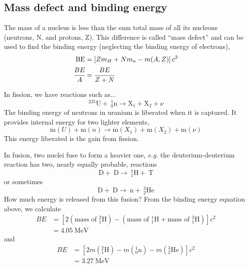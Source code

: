 \documentclass[11pt]{report} %
\begin{document}
\subsection{Mass defect and binding energy}
The mass of a nucleus is less than the sum total mass of all its nucleons (neutrons, N, and protons, Z). This difference is called ``mass defect'' and can be used to find the binding energy (neglecting the binding energy of electrons),
\begin{align}
\mathrm{BE} &= \left[Zm_H + Nm_n - m(A,Z)\right]c^2\\
\cfrac{BE}{A}&=\cfrac{BE}{Z+N}
\end{align}

In fission, we have reactions such as...
\begin{equation}
^{235}\mathrm{U}+~_0^1\mathrm{n} \rightarrow \mathrm{X}_1 +\mathrm{ X}_2 + \nu
\end{equation}
The binding energy of neutrons in uranium is liberated when it is captured. It provides internal energy for two lighter elements,
\begin{equation}
\mathrm{m}(U) + \mathrm{m}(n) \rightarrow \mathrm{m}(X_1) + \mathrm{m}(X_2) + \mathrm{m}(\nu)
\end{equation}
This energy liberated is the gain from fission.

In fusion, two nuclei fuse to form a heavier one, {\it e.g.} the deuterium-deuterium reaction has two, nearly equally probable, reactions
\begin{equation}
\mathrm{D} +~\mathrm{D}\xrightarrow{}~_1^1\mathrm{H}+~\mathrm{T}
\end{equation}
or sometimes
\begin{equation}
\mathrm{D} +~\mathrm{D}\xrightarrow{}~\mathrm{n}+~^3_2\mathrm{He}
\end{equation}
How much energy is released from this fusion? From the binding energy equation above, we calculate
\begin{align*}
BE &= \left[2(\text{mass of $_1^2$H}) - (\text{mass of $_1^1$H} + \text{mass of $_1^3$H})\right]c^2\\
& = 4.05~\text{MeV}
\end{align*}
and
\begin{align*}
BE &= \left[2m(_1^2\mathrm{H}) - m(_0^1\mathrm{n}) - m(_2^3\mathrm{He})\right]c^2\\
& = 3.27~\text{MeV}
\end{align*}
\end{document}
